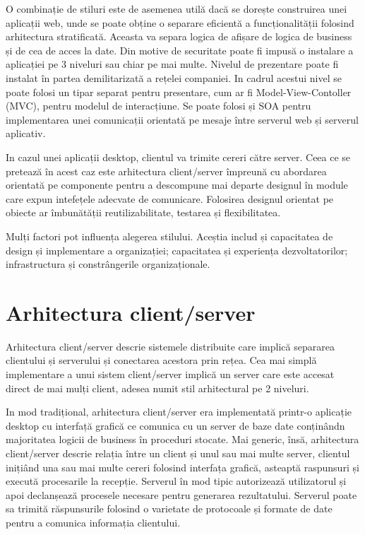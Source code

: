 \documentclass[12pt, a4paper, oneside, romanian]{teza-upb}
\begin{document}
O combinație de stiluri este de asemenea utilă dacă se dorește construirea unei aplicații web, unde se poate obține o separare eficientă a funcționalității folosind arhitectura stratificată. Aceasta va separa logica de afișare de logica de business și de cea de acces la date. Din motive de securitate poate fi impusă o instalare a aplicației pe 3 niveluri sau chiar pe mai multe.
Nivelul de prezentare poate fi instalat în partea demilitarizată a rețelei companiei. In cadrul acestui nivel se poate folosi un tipar separat pentru presentare, cum ar fi Model-View-Contoller (MVC), pentru modelul de interacțiune.  
Se poate folosi și SOA pentru implementarea unei comunicații orientată pe mesaje între serverul web și serverul aplicativ.

In cazul unei aplicații desktop, clientul va trimite cereri către server. Ceea ce se pretează în acest caz este arhitectura client/server împreună cu abordarea orientată pe componente pentru a descompune mai departe designul în module care expun intefețele adecvate de comunicare. Folosirea designul orientat pe obiecte ar îmbunătății reutilizabilitate, testarea și flexibilitatea.

Mulți factori pot influența alegerea stilului. Aceștia includ și capacitatea de design și implementare a organizației; capacitatea și experiența dezvoltatorilor; infrastructura și constrângerile organizaționale. 

\section{Arhitectura client/server}
Arhitectura client/server descrie sistemele distribuite care implică separarea clientului și serverului și conectarea acestora prin rețea. Cea mai simplă implementare a unui sistem client/server implică un server care este accesat direct de mai mulți client, adesea numit stil arhitectural pe 2 niveluri.

In mod tradițional, arhitectura client/server era implementată printr-o aplicație desktop cu interfață grafică ce comunica cu un server de baze date conținândn majoritatea logicii de business în proceduri stocate. Mai generic, însă, arhitectura client/server descrie relația între un client și unul sau mai multe server, clientul inițiând una sau mai multe cereri folosind interfața grafică, asteaptă raspunsuri și execută procesarile la recepție. Serverul în mod tipic autorizează utilizatorul și apoi declanșează procesele necesare pentru generarea rezultatului. Serverul poate sa trimită răspunsurile folosind o varietate de protocoale și formate de date pentru a comunica informația clientului.
\end{document}
